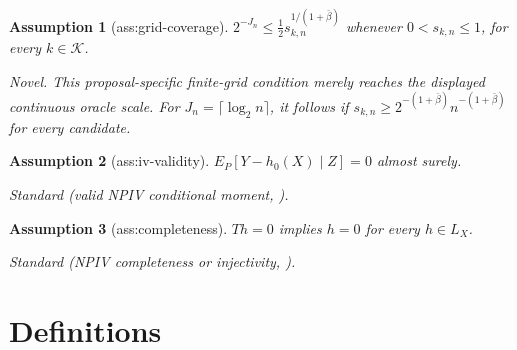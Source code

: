 \documentclass{article}
\newtheorem{assumption}{Assumption}
\begin{document}
\begin{assumption}[ass:grid-coverage]\label{ass:grid-coverage}
\(2^{-J_n}\le\tfrac12 s_{k,n}^{1/(1+\bar\beta)}\) whenever \(0<s_{k,n}\le1\), for every \(k\in\mathcal K\).
\par\smallskip\noindent\emph{Novel.} This proposal-specific finite-grid condition merely reaches the displayed continuous oracle scale. For \(J_n=\lceil\log_2 n\rceil\), it follows if \(s_{k,n}\ge 2^{-(1+\bar\beta)}n^{-(1+\bar\beta)}\) for every candidate.
\end{assumption}

\begin{assumption}[ass:iv-validity]\label{ass:iv-validity}
\(E_P[Y-h_0(X)\mid Z]=0\) almost surely.
\par\smallskip\noindent\emph{Standard} (valid NPIV conditional moment, \cite{BennettKallusMaoNeweySyrgkanisUehara2023MinimaxIV}).
\end{assumption}

\begin{assumption}[ass:completeness]\label{ass:completeness}
\(Th=0\) implies \(h=0\) for every \(h\in L_X\).
\par\smallskip\noindent\emph{Standard} (NPIV completeness or injectivity, \cite{BennettKallusMaoNeweySyrgkanisUehara2023MinimaxIV}).
\end{assumption}

\section{Definitions}
\end{document}
